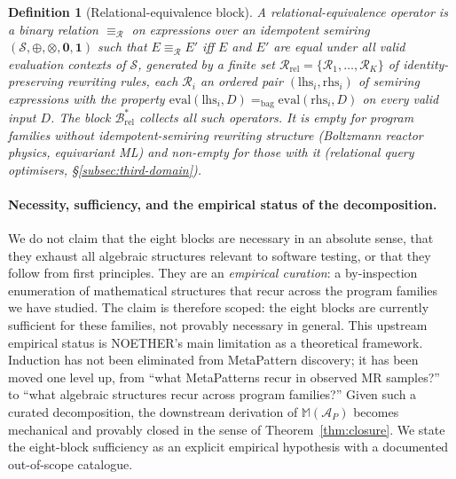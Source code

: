 \documentclass[acmsmall, screen]{acmart}
\newtheorem{definition}{Definition}
\begin{document}
\begin{definition}[Relational-equivalence block]
\label{def:b-rel}
A \emph{relational-equivalence operator} is a binary relation $\equiv_{\mathcal{R}}$ on expressions over an idempotent semiring $(\mathcal{S}, \oplus, \otimes, \mathbf{0}, \mathbf{1})$ such that $E \equiv_{\mathcal{R}} E'$ iff $E$ and $E'$ are equal under all valid evaluation contexts of $\mathcal{S}$, generated by a finite set $\mathcal{R}_{\mathrm{rel}} = \{\mathcal{R}_1, \dots, \mathcal{R}_K\}$ of identity-preserving rewriting rules, each $\mathcal{R}_i$ an ordered pair $(\mathrm{lhs}_i, \mathrm{rhs}_i)$ of semiring expressions with the property $\mathrm{eval}(\mathrm{lhs}_i, D) =_{\mathrm{bag}} \mathrm{eval}(\mathrm{rhs}_i, D)$ on every valid input $D$. The block $\mathcal{B}^{*}_{\mathrm{rel}}$ collects all such operators. It is empty for program families without idempotent-semiring rewriting structure (Boltzmann reactor physics, equivariant ML) and non-empty for those with it (relational query optimisers, \S\ref{subsec:third-domain}).
\end{definition}

\paragraph{Necessity, sufficiency, and the empirical status of the decomposition.} We do not claim that the eight blocks are necessary in an absolute sense, that they exhaust all algebraic structures relevant to software testing, or that they follow from first principles. They are an \emph{empirical curation}: a by-inspection enumeration of mathematical structures that recur across the program families we have studied. The claim is therefore scoped: the eight blocks are currently sufficient for these families, not provably necessary in general. This upstream empirical status is NOETHER's main limitation as a theoretical framework. Induction has not been eliminated from MetaPattern discovery; it has been moved one level up, from ``what MetaPatterns recur in observed MR samples?'' to ``what algebraic structures recur across program families?'' Given such a curated decomposition, the downstream derivation of $\mathbb{M}(\mathcal{A}_P)$ becomes mechanical and provably closed in the sense of Theorem~\ref{thm:closure}. We state the eight-block sufficiency as an explicit empirical hypothesis with a documented out-of-scope catalogue.
\end{document}
